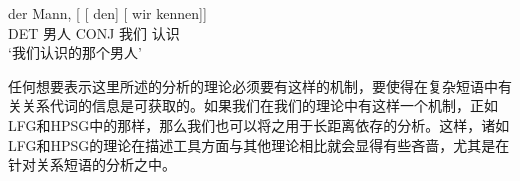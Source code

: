 \ea
\gll der Mann, [ [ den] [ wir kennen]]\\
	 DET 男人 {} {} CONJ {} 我们 认识\\
\glt `我们认识的那个男人'
\z
\begin{sloppypar}
\noindent
任何想要表示这里所述的分析的理论必须要有这样的机制，要使得在复杂短语中有关关系代词的信息是可获取的。如果我们在我们的理论中有这样一个机制，正如LFG\indexlfg 和HPSG中的那样，那么我们也可以将之用于长距离依存的分析。这样，诸如LFG和HPSG的理论在描述工具方面与其他理论相比就会显得有些吝啬，尤其是在针对关系短语的分析之中。
\end{sloppypar}


